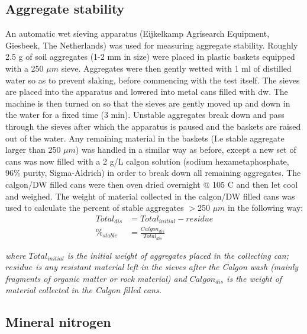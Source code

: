 \documentclass[12pt]{report}
\begin{document}
		
		\subsection{Aggregate stability}
		
		An automatic wet sieving apparatus (Eijkelkamp Agrisearch Equipment, Giesbeek, The Netherlands) was used for measuring aggregate stability. Roughly 2.5 g of soil aggregates (1-2 mm in size) were placed in plastic baskets equipped with a 250 $ \mu m $ sieve. Aggregates were then gently wetted with 1 ml of distilled water so as to prevent slaking, before commencing with the test itself. The sieves are  placed into the apparatus and lowered into metal cans filled with \gls{dw}. The machine is then turned on so that the sieves are gently moved up and down in the water for a fixed time (3 min). Unstable aggregates break down and pass through the sieves after which the apparatus is paused and the baskets are raised out of the water. Any remaining material in the baskets (I.e stable aggregate larger than 250 $ \mu m $) was handled in a similar way as before, except a new set of cans was now filled with a 2 g/L calgon solution (sodium hexametaphosphate, 96\% purity, Sigma-Aldrich) in order to break down all remaining aggregates. The calgon/DW filled cans were then oven dried overnight @ 105 C and  then let cool and weighed. The weight of material collected in the calgon/DW filled cans was used to calculate the percent of stable aggregates $ > $250 $ \mu m $ in the following way:\\
		
		\begin{align}
		Total_{dis} &= Total_{initial} - residue\\
		\%_{stable} &= \frac{Calgon_{dis}}{Total_{dis}}
		\end{align}
		
		\begin{adjustwidth}{50pt}{50pt}
			\begin{footnotesize}
				\textit{where $ Total_{initial} $ is the initial weight of aggregates placed in the collecting can; $ residue $ is any resistant material left in the sieves after the Calgon wash (mainly fragments of organic matter  or rock material) and $ Calgon_{dis} $ is the weight of material collected in the Calgon filled cans.
				}\\
			\end{footnotesize}
		\end{adjustwidth}
		
		\subsection{Mineral nitrogen}
		
\end{document}
